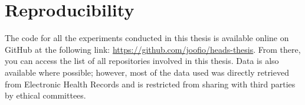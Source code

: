 \chapter*{Reproducibility}


The code for all the experiments conducted in this thesis is available online on GitHub at the following link: \url{https://github.com/joofio/heads-thesis}. From there, you can access the list of all repositories involved in this thesis. Data is also available where possible; however, most of the data used was directly retrieved from Electronic Health Records and is restricted from sharing with third parties by ethical committees.